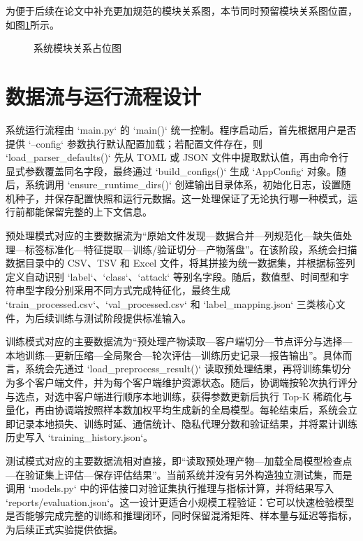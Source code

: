 为便于后续在论文中补充更加规范的模块关系图，本节同时预留模块关系图位置，如图\ref{fig:module-relationship-placeholder}所示。

\begin{figure}[htbp]
    \centering
    \caption{系统模块关系占位图}
    \label{fig:module-relationship-placeholder}
\end{figure}

\section{数据流与运行流程设计}
\label{sec:system-design-dataflow}

系统运行流程由 `main.py` 的 `main()` 统一控制。程序启动后，首先根据用户是否提供 `--config` 参数执行默认配置加载；若配置文件存在，则 `load\_parser\_defaults()` 先从 TOML 或 JSON 文件中提取默认值，再由命令行显式参数覆盖同名字段，最终通过 `build\_configs()` 生成 `AppConfig` 对象。随后，系统调用 `ensure\_runtime\_dirs()` 创建输出目录体系，初始化日志，设置随机种子，并保存配置快照和运行元数据。这一处理保证了无论执行哪一种模式，运行前都能保留完整的上下文信息。

预处理模式对应的主要数据流为“原始文件发现—数据合并—列规范化—缺失值处理—标签标准化—特征提取—训练/验证切分—产物落盘”。在该阶段，系统会扫描数据目录中的 CSV、TSV 和 Excel 文件，将其拼接为统一数据集，并根据标签列定义自动识别 `label`、`class`、`attack` 等别名字段。随后，数值型、时间型和字符串型字段分别采用不同方式完成特征化，最终生成 `train\_processed.csv`、`val\_processed.csv` 和 `label\_mapping.json` 三类核心文件，为后续训练与测试阶段提供标准输入。

训练模式对应的主要数据流为“预处理产物读取—客户端切分—节点评分与选择—本地训练—更新压缩—全局聚合—轮次评估—训练历史记录—报告输出”。具体而言，系统会先通过 `load\_preprocess\_result()` 读取预处理结果，再将训练集切分为多个客户端文件，并为每个客户端维护资源状态。随后，协调端按轮次执行评分与选点，对选中客户端进行顺序本地训练，获得参数更新后执行 Top-K 稀疏化与量化，再由协调端按照样本数加权平均生成新的全局模型。每轮结束后，系统会立即记录本地损失、训练时延、通信统计、隐私代理分数和验证结果，并将累计训练历史写入 `training\_history.json`。

测试模式对应的主要数据流相对直接，即“读取预处理产物—加载全局模型检查点—在验证集上评估—保存评估结果”。当前系统并没有另外构造独立测试集，而是调用 `models.py` 中的评估接口对验证集执行推理与指标计算，并将结果写入 `reports/evaluation.json`。这一设计更适合小规模工程验证：它可以快速检验模型是否能够完成完整的训练和推理闭环，同时保留混淆矩阵、样本量与延迟等指标，为后续正式实验提供依据。

